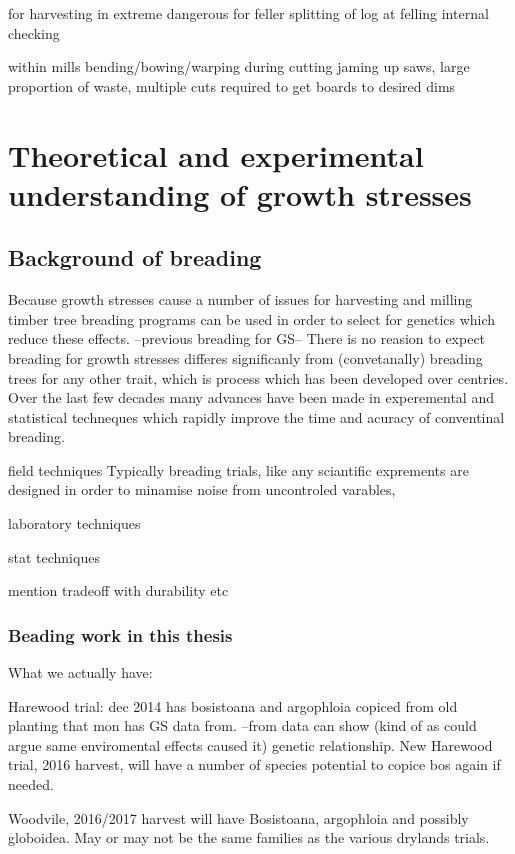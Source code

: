 \documentclass{article}
\begin{document}
for harvesting
in extreme dangerous for feller
splitting of log at felling
internal checking

within mills
bending/bowing/warping during cutting jaming up saws, large proportion of waste,
multiple cuts required to get boards to desired dims

\section{Theoretical and experimental understanding of growth stresses}

\subsection{Background of breading}
Because growth stresses cause a number of issues for harvesting and milling
timber tree breading programs can be used in order to select for genetics which
reduce these effects. --previous breading for GS-- There is no reasion to
expect  breading for growth stresses differes significanly from (convetanally)
breading trees for any other trait, which is process which has been developed
over centries. Over the last few decades many advances have been made in
experemental and statistical techneques which rapidly improve the time and
acuracy of conventinal breading.

 field techniques
Typically breading trials, like any sciantific exprements are designed in order
to minamise noise from uncontroled varables,

laboratory techniques


stat techniques

mention tradeoff with durability etc

\subsubsection{Beading work in this thesis}
What we actually have:

Harewood trial:
dec 2014 has bosistoana and argophloia copiced from old planting that mon has GS
data from. --from data can show (kind of as could argue same enviromental
effects caused it) genetic relationship.
New Harewood trial, 2016 harvest, will
have a number of species potential to copice bos again if needed.

Woodvile, 2016/2017 harvest will have Bosistoana, argophloia and possibly globoidea.
May or may not be the same families as the various drylands trials.
\end{document}

